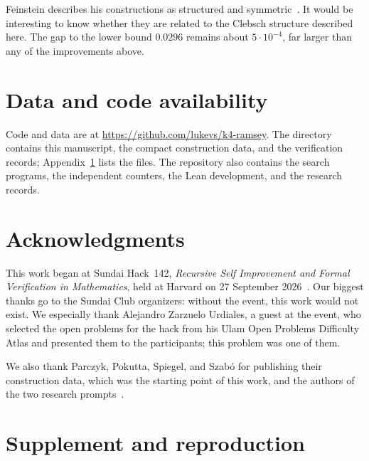 \documentclass[11pt]{article}
\theoremstyle{definition}
\theoremstyle{remark}
\newcommand{\code}[1]{\texttt{\detokenize{#1}}}
\begin{document}
Feinstein describes his constructions as structured and symmetric~\cite{feinstein2026}.
It would be interesting to know whether they are related to the Clebsch structure described here.
The gap to the lower bound $0.0296$ remains about $5\cdot10^{-4}$, far larger than any of the improvements above.

\section*{Data and code availability}

Code and data are at \url{https://github.com/lukevs/k4-ramsey}.
The \code{paper/} directory contains this manuscript, the compact construction data, and the verification records; Appendix~\ref{app:reproduction} lists the files.
The repository also contains the search programs, the independent counters, the Lean development, and the research records.

\section*{Acknowledgments}

This work began at Sundai Hack~142, \emph{Recursive Self Improvement and Formal Verification in Mathematics}, held at Harvard on 27 September 2026~\cite{sundai2026}.
Our biggest thanks go to the Sundai Club organizers: without the event, this work would not exist.
We especially thank Alejandro Zarzuelo Urdiales, a guest at the event, who selected the open problems for the hack from his Ulam Open Problems Difficulty Atlas and presented them to the participants; this problem was one of them.

We also thank Parczyk, Pokutta, Spiegel, and Szab\'o for publishing their construction data, which was the starting point of this work, and the authors of the two research prompts~\cite{jacobianprompt,cdcprompt}.

\appendix
\section{Supplement and reproduction}
\label{app:reproduction}
\end{document}
